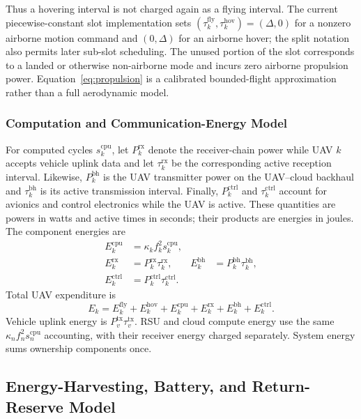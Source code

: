 Thus a hovering interval is not charged again as a flying interval. The
current piecewise-constant slot implementation sets
$(\tau_k^{\mathrm{fly}},\tau_k^{\mathrm{hov}})=(\Delta,0)$ for a nonzero
airborne motion command and $(0,\Delta)$ for an airborne hover; the split
notation also permits later sub-slot scheduling. The unused portion of the
slot corresponds to a landed or otherwise non-airborne mode and incurs zero
airborne propulsion power. Equation~\eqref{eq:propulsion} is a calibrated
bounded-flight approximation rather than a full aerodynamic model.

\subsubsection{Computation and Communication-Energy Model}
For computed cycles $s_k^{\mathrm{cpu}}$, let $P_k^{\mathrm{rx}}$ denote
the receiver-chain power while UAV $k$ accepts vehicle uplink data and let
$\tau_k^{\mathrm{rx}}$ be the corresponding active reception interval.
Likewise, $P_k^{\mathrm{bh}}$ is the UAV transmitter power on the
UAV--cloud backhaul and $\tau_k^{\mathrm{bh}}$ is its active transmission
interval. Finally, $P_k^{\mathrm{ctrl}}$ and
$\tau_k^{\mathrm{ctrl}}$ account for avionics and control electronics while
the UAV is active. These quantities are powers in watts and active times in
seconds; their products are energies in joules. The component energies are
\begin{equation}
\begin{aligned}
E_k^{\mathrm{cpu}}&=\kappa_k f_k^2s_k^{\mathrm{cpu}},\\
E_k^{\mathrm{rx}}&=P_k^{\mathrm{rx}}\tau_k^{\mathrm{rx}},&
E_k^{\mathrm{bh}}&=P_k^{\mathrm{bh}}\tau_k^{\mathrm{bh}},\\
E_k^{\mathrm{ctrl}}&=P_k^{\mathrm{ctrl}}\tau_k^{\mathrm{ctrl}}.&&
\end{aligned}
\label{eq:energy_components}
\end{equation}
Total UAV expenditure is
\begin{equation}
E_k=E_k^{\mathrm{fly}}+E_k^{\mathrm{hov}}+E_k^{\mathrm{cpu}}
+E_k^{\mathrm{rx}}+E_k^{\mathrm{bh}}+E_k^{\mathrm{ctrl}}.
\label{eq:uav_energy}
\end{equation}
Vehicle uplink energy is $P_v^{\mathrm{tx}}\tau_v^{\mathrm{tx}}$.
RSU and cloud compute energy use the same
$\kappa_nf_n^2s_n^{\mathrm{cpu}}$ accounting, with their receiver
energy charged separately. System energy sums ownership components once.

\subsection{Energy-Harvesting, Battery, and Return-Reserve Model}
